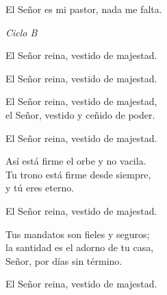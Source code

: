 \documentclass[12pt, letterpaper]{report}
\begin{document}
    \noindent
    El Se\~nor es mi pastor, nada me falta.
    \clearpage

    {%
\parindent 0pt
\noindent
\ifx\preLilyPondExample \undefined
\else
  \expandafter\preLilyPondExample
\fi
\def\lilypondbook{}%
%
\ifx\postLilyPondExample \undefined
\else
  \expandafter\postLilyPondExample
\fi
}
    \clearpage

    {%
\parindent 0pt
\noindent
\ifx\preLilyPondExample \undefined
\else
  \expandafter\preLilyPondExample
\fi
\def\lilypondbook{}%
%
\ifx\postLilyPondExample \undefined
\else
  \expandafter\postLilyPondExample
\fi
}
    \clearpage

    \LARGE \textit{Ciclo B}

    \noindent
    \LARGE El Se\~nor reina, vestido de majestad.

    \noindent
    El Se\~nor reina, vestido de majestad.

    \noindent
    El Se\~nor reina, vestido de majestad,\\
    el Se\~nor, vestido y ce\~nido de poder.

    \noindent
    El Se\~nor reina, vestido de majestad.

    \noindent
    As\'i est\'a firme el orbe y no vacila.\\
    Tu trono est\'a firme desde siempre,\\
    y t\'u eres eterno.

    \noindent
    El Se\~nor reina, vestido de majestad.

    \noindent
    Tus mandatos son fieles y seguros;\\
    la santidad es el adorno de tu casa,\\
    Se\~nor, por d\'ias sin t\'ermino.

    \noindent
    El Se\~nor reina, vestido de majestad.
    \clearpage

    {%
\parindent 0pt
\noindent
\ifx\preLilyPondExample \undefined
\else
  \expandafter\preLilyPondExample
\fi
\def\lilypondbook{}%
%
\ifx\postLilyPondExample \undefined
\else
  \expandafter\postLilyPondExample
\fi
}
    \clearpage

    {%
\parindent 0pt
\noindent
\ifx\preLilyPondExample \undefined
\else
  \expandafter\preLilyPondExample
\fi
\def\lilypondbook{}%
%
\ifx\postLilyPondExample \undefined
\else
  \expandafter\postLilyPondExample
\fi
}
    \clearpage
\end{document}
